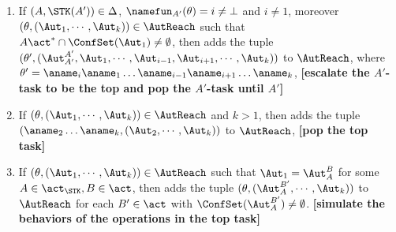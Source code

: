 {\begin{minipage}{0.9\textwidth}
\begin{enumerate}
    \item If $(A,\STK(A')) \in\Delta$, $\namefun_{A'}(\theta) = i \neq\bot$ and $i\neq 1$, moreover $(\theta, (\Aut_1,\cdots,\Aut_k)) \in \AutReach$ such that $A\act^*\cap\ConfSet(\Aut_1)\neq \emptyset$, 
        then adds the tuple $(\theta', (\Aut_{A'}^{A'},\Aut_1,\cdots,\Aut_{i-1},\Aut_{i+1},\cdots,\Aut_{k}))$ to $\AutReach$, where $\theta' = \aname_i\aname_1\dots\aname_{i-1}\aname_{i+1}\dots\aname_k$,
        \textbf{[escalate the $A'$-task to be the top and pop the $A'$-task until $A'$]}

    \item If $(\theta, (\Aut_1,\cdots,\Aut_k)) \in \AutReach$ and $k>1$, then adds the tuple $(\aname_2\dots\aname_k, (\Aut_2,\cdots,\Aut_k))$ to $\AutReach$,
        \textbf{[pop the top task]}
    \item If $(\theta, (\Aut_1,\cdots,\Aut_k)) \in \AutReach$ such that $\Aut_1 = \Aut_A^B$ for some $A\in\act_{\STK},B\in\act$, then adds the tuple $(\theta, (\Aut_A^{B'},\cdots,\Aut_k))$ to $\AutReach$ for each $B'\in\act$ with $\ConfSet(\Aut_A^{B'})\neq\emptyset$.
        \textbf{[simulate the behaviors of the operations in the top task]}
\end{enumerate}
\end{minipage}
}

